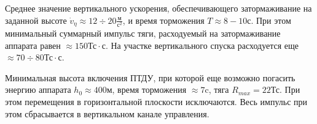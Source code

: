 Среднее значение вертикального ускорения, обеспечивающего затормаживание на заданной высоте $\Dot{v}_\eta \approx 12 \div 20 \frac{\text{м}}{\text{с}^2}$, и время торможения $T \approx 8 -10 $с. При этом минимальный суммарный импульс тяги, расходуемый на затормаживание аппарата равен $\approx 150 \text{Тс} \cdot \text{с}$. На участке вертикального спуска расходуется еще $\approx 70 \div 80 \text{Тс} \cdot \text{с}$.

Минимальная высота включения ПТДУ, при которой еще возможно
погасить энергию аппарата $h_0 \approx 400 \text{м}$, время торможения $\approx 7 \text{c}$, тяга $R_{max} = 22 \text{Тс}$. При этом перемещения в горизонтальной плоскости исключаются. Весь импульс при этом сбрасывается в вертикальном канале управления.
\clearpage